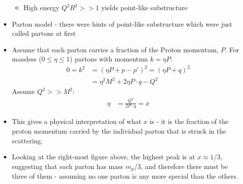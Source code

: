 \documentclass[a4paper, 11pt, normalem]{report}
\begin{document}
\begin{itemize}
\begin{itemize}
            \item High energy $Q^2R^2 >> 1$ yields point-like substructure
        \end{itemize}
    \item Parton model - there were hints of point-like substructure which were just called partons at first
    \item Assume that each parton carries a fraction of the Proton momentum, $P$.
        For massless ($0 \leq \eta \leq 1$) partons with momentum $k = \eta P$.
        \begin{align}
            0 = k^2 &= (\eta P + p-p')^2  = (\eta P + q)^2 \\
                    &= \eta^2M^2 + 2\eta P\cdot q - Q^2
        \end{align}
        Assume $Q^2 >> M^2$:
        \begin{align}
            \eta &= \frac{Q^2}{2P\cdot q} = x
        \end{align}
    \item This gives a physical interpretation of what $x$ is - it is the fraction of the proton momentum carried by the individual parton that is struck in the scattering. 
    \item Looking at the right-most figure above, the highest peak is at $x \approx 1/3$, suggesting that each parton has mass $m_p/3$, and therefore there must be three of them - assuming no one parton is any more special than the others. 
\end{itemize}
\end{document}
